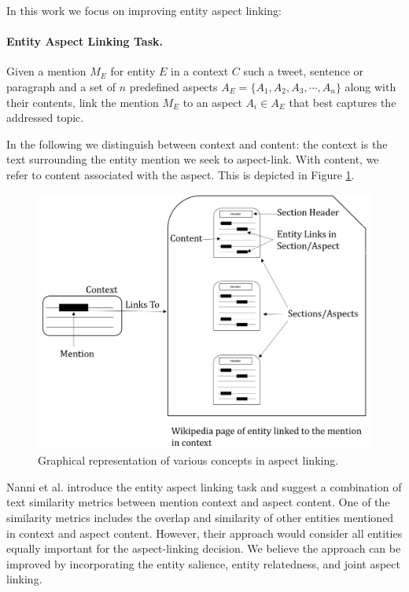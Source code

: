 \noindent In this work we focus on improving entity aspect linking:

\paragraph{\textbf{Entity Aspect Linking Task.}} Given a mention $M_E$ for entity $E$ in a context $C$ such a tweet, sentence or paragraph and a set of $n$ predefined aspects $A_{E} = \{A_1, A_2, A_3, \cdots, A_n\}$ along with their contents, link the mention $M_E$ to an aspect $A_i \in A_{E}$ that best captures the addressed topic. 

\bigskip
In the following we distinguish between context and content: the context is the text surrounding the entity mention we seek to aspect-link. With content, we refer to content associated with the aspect. This is depicted in Figure \ref{fig:context-vs-content}.

\begin{figure}
    \centering
    \includegraphics [scale=0.6]{context-and-content.png}
    \caption{Graphical representation of various concepts in aspect linking.}
    \label{fig:context-vs-content}
\end{figure}

Nanni et al. \cite{nanni2018entity} introduce the entity aspect linking task and suggest a combination of text similarity metrics between mention context and aspect content. One of the similarity metrics includes the overlap and similarity of other entities mentioned in context and aspect content. However, their approach would consider all entities equally important for the aspect-linking decision. We believe the approach can be improved by incorporating the entity salience, entity relatedness, and joint aspect linking.  

